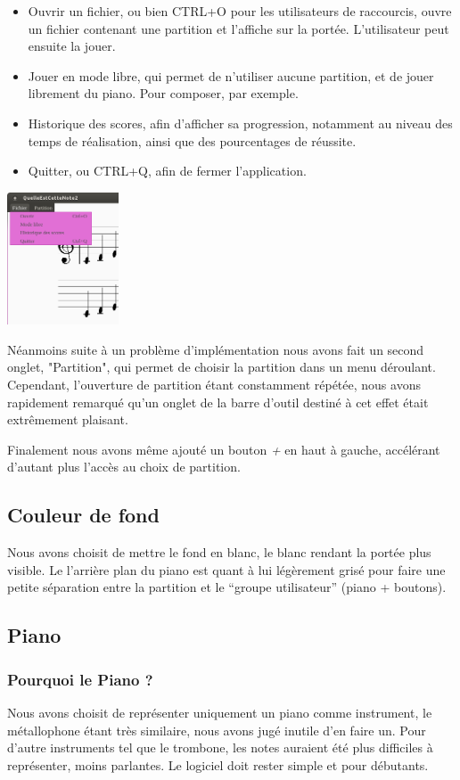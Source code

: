 \documentclass{article}
\begin{document}
\begin{itemize}
\item Ouvrir un fichier, ou bien CTRL+O pour les utilisateurs de raccourcis, ouvre un fichier contenant une partition et l'affiche sur la portée. L'utilisateur peut ensuite la jouer.
\item Jouer en mode libre, qui permet de n'utiliser aucune partition, et de jouer librement du piano. Pour composer, par exemple.
\item Historique des scores, afin d'afficher sa progression, notamment au niveau des temps de réalisation, ainsi que des pourcentages de réussite.
\item Quitter, ou CTRL+Q, afin de fermer l'application. 
\end{itemize}
\begin{center}
\includegraphics[width = 125px]{./images/toolBar.png}
\end{center}
Néanmoins suite à un problème d'implémentation nous avons fait un second onglet, "Partition", qui permet de choisir la partition dans un menu déroulant. Cependant, l'ouverture de partition étant constamment répétée, nous avons rapidement remarqué qu'un onglet de la barre d'outil destiné à cet effet était extrêmement plaisant. 

Finalement nous avons même ajouté un bouton \emph{+} en haut à gauche, accélérant d'autant plus l'accès au choix de partition. 

\subsection{Couleur de fond}
Nous avons choisit de mettre le fond en blanc, le blanc rendant la portée plus visible.
Le l'arrière plan du piano est quant à lui légèrement grisé pour faire une petite séparation entre la partition et le 
``groupe utilisateur'' (piano + boutons).
\subsection{Piano}
\subsubsection{Pourquoi le Piano ?}
Nous avons choisit de représenter uniquement un piano comme instrument, le métallophone étant très similaire, nous avons
jugé inutile d'en faire un. Pour d'autre instruments tel que le trombone, les notes auraient été plus difficiles à représenter,
moins parlantes. Le logiciel doit rester simple et pour débutants.
\end{document}
